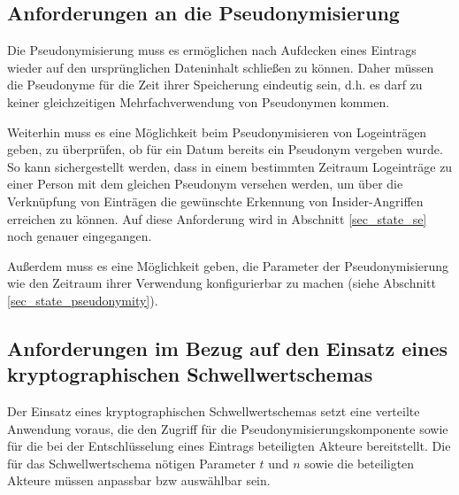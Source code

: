 \subsection{Anforderungen an die Pseudonymisierung}

\label{subsec_impl_requirements_pseudonymity}


Die Pseudonymisierung muss es ermöglichen nach Aufdecken eines Eintrags wieder auf den ursprünglichen Dateninhalt schließen zu können. Daher müssen die Pseudonyme für die Zeit ihrer Speicherung eindeutig sein, d.h. es darf zu keiner gleichzeitigen Mehrfachverwendung von Pseudonymen kommen. 

Weiterhin muss es eine Möglichkeit beim Pseudonymisieren von Logeinträgen geben, zu überprüfen, ob für ein Datum bereits ein Pseudonym vergeben wurde. So kann sichergestellt werden, dass in einem bestimmten Zeitraum Logeinträge zu einer Person mit dem gleichen Pseudonym versehen werden, um über die Verknüpfung von Einträgen die gewünschte Erkennung von Insider-Angriffen erreichen zu können. Auf diese Anforderung wird in Abschnitt \ref{sec_state_se} noch genauer eingegangen.

Außerdem muss es eine Möglichkeit geben, die Parameter der Pseudonymisierung wie den Zeitraum ihrer Verwendung konfigurierbar zu machen (siehe Abschnitt \ref{sec_state_pseudonymity}).

\subsection{Anforderungen im Bezug auf den Einsatz eines kryptographischen Schwellwertschemas}

\label{subsec_impl_requirements_threshold}


Der Einsatz eines kryptographischen Schwellwertschemas setzt eine verteilte Anwendung voraus, die den Zugriff für die Pseudonymisierungskomponente sowie für die bei der Entschlüsselung eines Eintrags beteiligten Akteure bereitstellt. Die für das Schwellwertschema nötigen Parameter \(t\) und \(n\) sowie die beteiligten Akteure müssen anpassbar bzw auswählbar sein.

